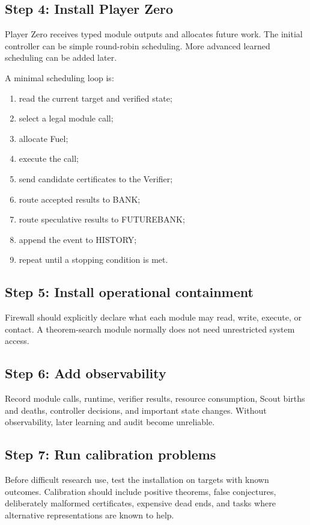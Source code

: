 \documentclass[11pt]{article}
\begin{document}
\subsection{Step 4: Install Player Zero}

Player Zero receives typed module outputs and allocates future work. The initial controller can be simple round-robin scheduling. More advanced learned scheduling can be added later.

A minimal scheduling loop is:
\begin{enumerate}
\item read the current target and verified state;
\item select a legal module call;
\item allocate Fuel;
\item execute the call;
\item send candidate certificates to the Verifier;
\item route accepted results to BANK;
\item route speculative results to FUTUREBANK;
\item append the event to HISTORY;
\item repeat until a stopping condition is met.
\end{enumerate}

\subsection{Step 5: Install operational containment}

Firewall should explicitly declare what each module may read, write, execute, or contact. A theorem-search module normally does not need unrestricted system access.

\subsection{Step 6: Add observability}

Record module calls, runtime, verifier results, resource consumption, Scout births and deaths, controller decisions, and important state changes. Without observability, later learning and audit become unreliable.

\subsection{Step 7: Run calibration problems}

Before difficult research use, test the installation on targets with known outcomes. Calibration should include positive theorems, false conjectures, deliberately malformed certificates, expensive dead ends, and tasks where alternative representations are known to help.
\end{document}
